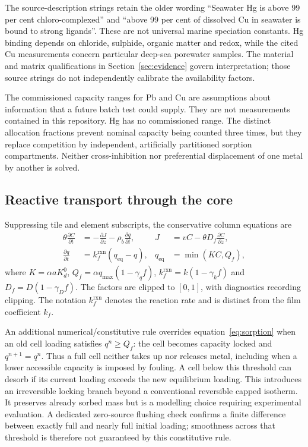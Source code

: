 The source-description strings retain the older wording ``Seawater Hg is above 99 per cent chloro-complexed'' and ``above 99 per cent of dissolved Cu in seawater is bound to strong ligands''. These are not universal marine speciation constants. Hg binding depends on chloride, sulphide, organic matter and redox, while the cited Cu measurements concern particular deep-sea porewater samples. The material and matrix qualifications in Section~\ref{sec:evidence} govern interpretation; those source strings do not independently calibrate the availability factors.

The commissioned capacity ranges for Pb and Cu are assumptions about information that a future batch test could supply. They are not measurements contained in this repository. Hg has no commissioned range. The distinct allocation fractions prevent nominal capacity being counted three times, but they replace competition by independent, artificially partitioned sorption compartments. Neither cross-inhibition nor preferential displacement of one metal by another is solved.

\subsection{Reactive transport through the core}
\label{sec:reactive_equations}

Suppressing tile and element subscripts, the conservative column equations are
\begin{align}
 \theta\frac{\partial C}{\partial t}
 &=-\frac{\partial J}{\partial z}-\rho_b\frac{\partial q}{\partial t},
 &J&=vC-\theta D_f\frac{\partial C}{\partial z},\label{eq:column_balance}\\
 \frac{\partial q}{\partial t}
 &=k_f^{\mathrm{rxn}}\left(q_{\mathrm{eq}}-q\right),
 &q_{\mathrm{eq}}&=\min\!\left(KC,Q_f\right),\label{eq:sorption}
\end{align}
where $K=\alpha aK_d^0$, $Q_f=\alpha q_{\max}(1-\gamma_qf)$,
$k_f^{\mathrm{rxn}}=k(1-\gamma_kf)$ and $D_f=D(1-\gamma_Df)$. The factors are clipped to $[0,1]$, with diagnostics recording clipping. The notation $k_f^{\mathrm{rxn}}$ denotes the reaction rate and is distinct from the film coefficient $k_f$.

An additional numerical/constitutive rule overrides equation~\eqref{eq:sorption} when an old cell loading satisfies $q^n\geq Q_f$: the cell becomes capacity locked and $q^{n+1}=q^n$. Thus a full cell neither takes up nor releases metal, including when a lower accessible capacity is imposed by fouling. A cell below this threshold can desorb if its current loading exceeds the new equilibrium loading. This introduces an irreversible locking branch beyond a conventional reversible capped isotherm. It preserves already sorbed mass but is a modelling choice requiring experimental evaluation. A dedicated zero-source flushing check confirms a finite difference between exactly full and nearly full initial loading; smoothness across that threshold is therefore not guaranteed by this constitutive rule.

